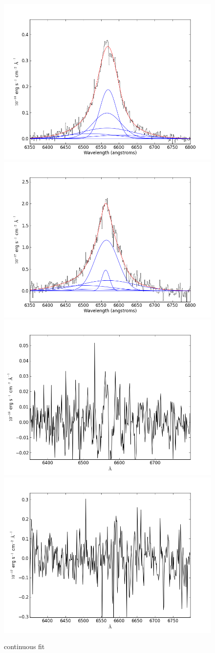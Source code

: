 \documentclass[usenatbib]{mn2e}
\begin{document}
\newpage


\begin{figure}
\begin{center}
\includegraphics[width=0.46\linewidth,angle=0]{Halpha_14.png}
\vspace{5mm}
\includegraphics[width=0.49\linewidth,angle=0]{Halpha_15.png}\\
\includegraphics[width=0.46\linewidth,angle=0]{Halpha_res_14.png}
\hspace{5mm}
\includegraphics[width=0.49\linewidth,angle=0]{Halpha_res_15.png}\\
\end{center} 
\caption{continuous fit \label{fig:landscape}}   
\end{figure}
\end{document}
